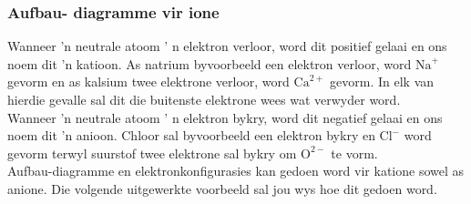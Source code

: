 \subsubsection*{Aufbau- diagramme vir ione}
Wanneer 'n neutrale atoom ' n elektron verloor, word dit positief gelaai en ons noem dit 'n katioon. As natrium byvoorbeeld een elektron verloor, word $\text{Na}^{+}$ gevorm en as kalsium twee elektrone verloor, word $\text{Ca}^{2+}$ gevorm. In elk van hierdie gevalle sal dit die buitenste elektrone wees wat verwyder word.\\
Wanneer 'n neutrale atoom ' n elektron bykry, word dit negatief gelaai en ons noem dit 'n anioon. Chloor sal byvoorbeeld een elektron bykry en $\text{Cl}^{-}$ word gevorm terwyl suurstof twee elektrone sal bykry om $\text{O}^{2-}$ te vorm. \\
Aufbau-diagramme en elektronkonfigurasies kan gedoen word vir katione sowel as anione. Die volgende uitgewerkte voorbeeld sal jou wys hoe dit gedoen word.
